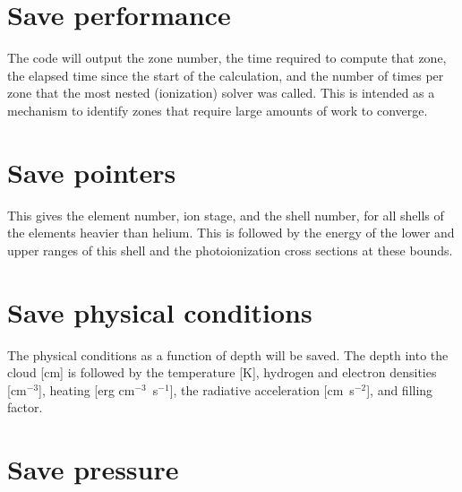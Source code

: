 \section{Save performance}

The code will output the zone number, the time required to compute that
zone, the elapsed time since the start of the calculation, and
the number of times per zone that the most nested (ionization) solver was called.
This is intended as a mechanism to identify zones that require large amounts of
work to converge. 

\section{Save pointers}

This gives the element number, ion stage, and the shell number, for all
shells of the elements heavier than helium.
This is followed by the energy
of the lower and upper ranges of this shell and the photoionization cross
sections at these bounds.

\section{Save physical conditions}

The physical conditions as a function of depth will be saved.  The
depth into the cloud [cm] is followed by the temperature [K], hydrogen and
electron densities [cm$^{-3}$], heating [erg cm$^{-3}$~s$^{-1}$], the radiative acceleration
[cm~s$^{-2}$], and filling factor.

\section{Save pressure}

